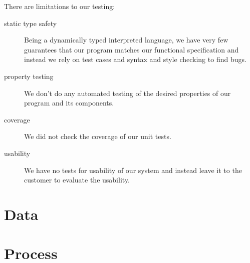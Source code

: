 \documentclass{article}
\begin{document}
There are limitations to our testing:
\begin{description}
  \item[static type safety] Being a dynamically typed interpreted language, we have very few guarantees that our program matches our functional specification and instead we rely on test cases and syntax and style checking to find bugs.
  \item[property testing] We don't do any automated testing of the desired properties of our program and its components.
  \item[coverage] We did not check the coverage of our unit tests.
  \item[usability] We have no tests for usability of our system and instead leave it to the customer to evaluate the usability.
\end{description}

\section{Data}


\section{Process}

\end{document}
